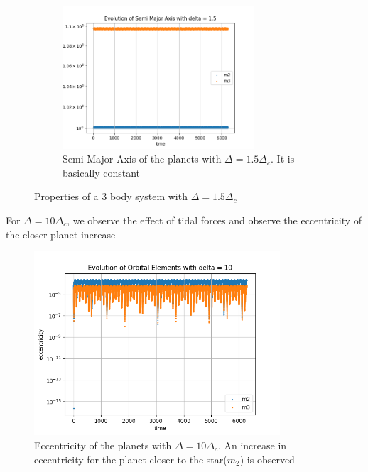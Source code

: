 \documentclass[12pt,a4paper]{article}
\begin{document}
\begin{figure}[H]
  \begin{subfigure}{0.49\textwidth}
    \centering
    \includegraphics[height = 2.1in]{3Body/3BD_a_delta1.5.png}
    \caption{Semi Major Axis of the planets with $\Delta = 1.5\Delta_c$. It is basically constant}
    \label{fig:3Body_1.5_a}
  \end{subfigure}
  \caption{Properties of a 3 body system with $\Delta = 1.5\Delta_c$}
\end{figure}

For $\Delta=10\Delta_c$, we observe the effect of tidal forces and observe the eccentricity of the closer planet increase
\begin{figure}[H]
  \centering
  \includegraphics[height = 2.7in]{3Body/3BD_ecc_delta10.png}
  \caption{Eccentricity of the planets with $\Delta = 10\Delta_c$. An increase in eccentricity for the planet closer to the star($m_2$) is observed}
  \label{fig:3Body_10}
\end{figure}
\end{document}
